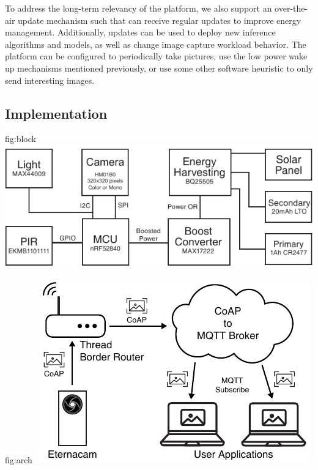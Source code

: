 To address the long-term relevancy of the platform, we also support an over-the-air update mechanism such that \namec can receive regular updates to improve energy management. Additionally, updates can be used to deploy new inference algorithms and models, as well as change image capture workload behavior. The platform can be configured to periodically take pictures, use the low power wake up mechanisms mentioned previously, or use some other software heuristic to only send interesting images.

\subsection{\namec Implementation}
\begin{definefigure}{fig:block}
\includegraphics[width=\columnwidth]{figs/permacam/figs/block_diagram.pdf}
\caption{\name system block diagram.
The system is based on the Himax HM01B0 camera and the Nordic NRF52840 MCU. We include a light and PIR sensor to provide a low power wake up mechanism to drive image capture. A hierarchical energy harvesting system with a rechargeable and non-rechargeable battery are utilized to provide a long, reliable lifetime to the system.
}
\end{definefigure}

\begin{definefigure}{fig:arch}
\includegraphics[width=0.85\columnwidth]{figs/permacam/figs/arch.pdf}
\caption{The \namec end-to-end image transfer architecture. \namec uses OpenThread, a 6LoWPAN network. This allows it to transmit images over the CoAP block protocol directly to any IP endpoint. We implement a CoAP server to receive and reassemble image, demosaic them, and publish them over an MQTT stream. This CoAP server can be local to the sensors if privacy is desired. User applications running on PCs or on servers can easily subscribe to incoming images.}
\end{definefigure}

